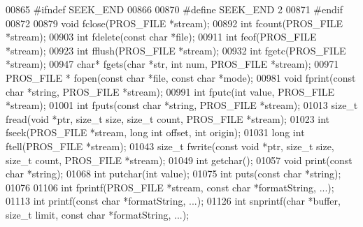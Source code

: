 \begin{DoxyCode}
00865 \textcolor{preprocessor}{#ifndef SEEK\_END}
00866 
00870 \textcolor{preprocessor}{#define       SEEK\_END 2}
00871 \textcolor{preprocessor}{#endif}
00872 
00879 \textcolor{keywordtype}{void} fclose(PROS_FILE *stream);
00892 \textcolor{keywordtype}{int} fcount(PROS_FILE *stream);
00903 \textcolor{keywordtype}{int} fdelete(\textcolor{keyword}{const} \textcolor{keywordtype}{char} *file);
00911 \textcolor{keywordtype}{int} feof(PROS_FILE *stream);
00923 \textcolor{keywordtype}{int} fflush(PROS_FILE *stream);
00932 \textcolor{keywordtype}{int} fgetc(PROS_FILE *stream);
00947 \textcolor{keywordtype}{char}* fgets(\textcolor{keywordtype}{char} *str, \textcolor{keywordtype}{int} num, PROS_FILE *stream);
00971 PROS_FILE * fopen(\textcolor{keyword}{const} \textcolor{keywordtype}{char} *file, \textcolor{keyword}{const} \textcolor{keywordtype}{char} *mode);
00981 \textcolor{keywordtype}{void} fprint(\textcolor{keyword}{const} \textcolor{keywordtype}{char} *\textcolor{keywordtype}{string}, PROS_FILE *stream);
00991 \textcolor{keywordtype}{int} fputc(\textcolor{keywordtype}{int} value, PROS_FILE *stream);
01001 \textcolor{keywordtype}{int} fputs(\textcolor{keyword}{const} \textcolor{keywordtype}{char} *\textcolor{keywordtype}{string}, PROS_FILE *stream);
01013 \textcolor{keywordtype}{size\_t} fread(\textcolor{keywordtype}{void} *ptr, \textcolor{keywordtype}{size\_t} size, \textcolor{keywordtype}{size\_t} count, PROS_FILE *stream);
01023 \textcolor{keywordtype}{int} fseek(PROS_FILE *stream, \textcolor{keywordtype}{long} \textcolor{keywordtype}{int} offset, \textcolor{keywordtype}{int} origin);
01031 \textcolor{keywordtype}{long} \textcolor{keywordtype}{int} ftell(PROS_FILE *stream);
01043 \textcolor{keywordtype}{size\_t} fwrite(\textcolor{keyword}{const} \textcolor{keywordtype}{void} *ptr, \textcolor{keywordtype}{size\_t} size, \textcolor{keywordtype}{size\_t} count, PROS_FILE *stream);
01049 \textcolor{keywordtype}{int} getchar();
01057 \textcolor{keywordtype}{void} print(\textcolor{keyword}{const} \textcolor{keywordtype}{char} *\textcolor{keywordtype}{string});
01068 \textcolor{keywordtype}{int} putchar(\textcolor{keywordtype}{int} value);
01075 \textcolor{keywordtype}{int} puts(\textcolor{keyword}{const} \textcolor{keywordtype}{char} *\textcolor{keywordtype}{string});
01076 
01106 \textcolor{keywordtype}{int} fprintf(PROS_FILE *stream, \textcolor{keyword}{const} \textcolor{keywordtype}{char} *formatString, ...);
01113 \textcolor{keywordtype}{int} printf(\textcolor{keyword}{const} \textcolor{keywordtype}{char} *formatString, ...);
01126 \textcolor{keywordtype}{int} snprintf(\textcolor{keywordtype}{char} *buffer, \textcolor{keywordtype}{size\_t} limit, \textcolor{keyword}{const} \textcolor{keywordtype}{char} *formatString, ...);

\end{DoxyCode}
